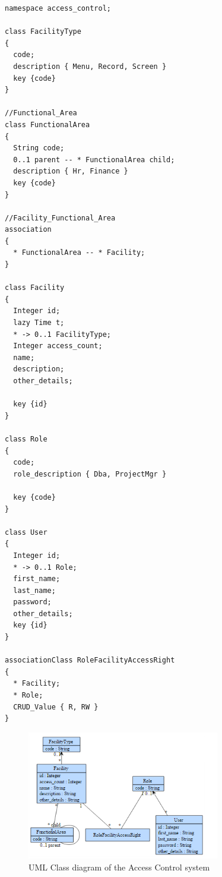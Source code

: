 \begin{lstlisting}[style=umpleIn]
namespace access_control;

class FacilityType
{
  code;
  description { Menu, Record, Screen }
  key {code}
}

//Functional_Area
class FunctionalArea
{
  String code;
  0..1 parent -- * FunctionalArea child;
  description { Hr, Finance }
  key {code}  
}

//Facility_Functional_Area
association
{
  * FunctionalArea -- * Facility;
}

class Facility
{
  Integer id;
  lazy Time t; 
  * -> 0..1 FacilityType;
  Integer access_count;
  name;
  description;
  other_details;
  
  key {id}
}

class Role
{
  code;
  role_description { Dba, ProjectMgr }
  
  key {code}
}

class User
{
  Integer id;
  * -> 0..1 Role;
  first_name;
  last_name;
  password;
  other_details;
  key {id}
}

associationClass RoleFacilityAccessRight
{
  * Facility;
  * Role;
  CRUD_Value { R, RW }
}
\end{lstlisting}

\begin{figure}[h]
\centering
\includegraphics[width=0.75\textwidth]{Figures/accessControl.png} 
\caption{UML Class diagram of the Access Control system}
\label{fig:preValidation}
\end{figure}

